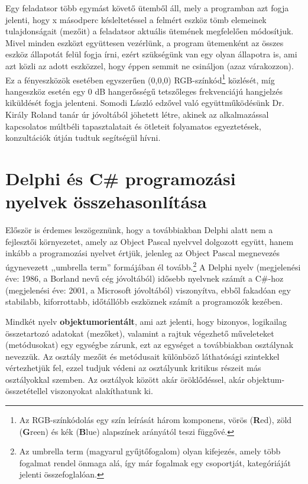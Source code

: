 \documentclass[tocnopagenum]{thesis-ekf}
\theoremstyle{definition}
\theoremstyle{remark}
\begin{document}
	Egy feladatsor több egymást követő ütemből áll, mely a programban azt fogja jelenti, hogy x másodperc késleltetéssel a felmért eszköz tömb elemeinek tulajdonságait (mezőit) a feladatsor aktuális ütemének megfelelően módosítjuk. Mivel minden eszközt együttesen vezérlünk, a program ütemenként az összes eszköz állapotát felül fogja írni, ezért szükségünk van egy olyan állapotra is, ami azt közli az adott eszközzel, hogy éppen semmit ne csináljon (azaz várakozzon). Ez a fényeszközök esetében egyszerűen (0,0,0) RGB-színkód\footnote{Az RGB-színkódolás egy szín leírását három komponens, vörös (\textbf{R}ed), zöld (\textbf{G}reen) és kék (\textbf{B}lue) alapszínek arányától teszi függővé.} közlését, míg hangeszköz esetén egy 0 dB hangerősségű tetszőleges frekvenciájú hangjelzés kiküldését fogja jelenteni.
	Somodi László edzővel való együttműködésünk Dr. Király Roland tanár úr jóvoltából jöhetett létre, akinek az alkalmazással kapcsolatos múltbéli tapasztalatait és  ötleteit folyamatos egyeztetések, konzultációk útján tudtuk segítségül hívni.
	\section{Delphi és C\# programozási nyelvek összehasonlítása}
	Először is érdemes leszögeznünk, hogy a továbbiakban Delphi alatt nem a fejlesztői környezetet, amely az Object Pascal nyelvvel dolgozott együtt, hanem inkább a programozási nyelvet értjük, jelenleg az Object Pascal megnevezés úgynevezett ,,umbrella term'' formájában él tovább.\footnote{Az umbrella term (magyarul gyűjtőfogalom) olyan kifejezés, amely több fogalmat rendel önmaga alá, így már fogalmak egy csoportját, kategóriáját jelenti összefoglalóan.} \cite{sof_delphi}
	A Delphi nyelv (megjelenési éve: 1986, a Borland nevű cég jóvoltából) idősebb nyelvnek számít a C\#-hoz (megjelenési éve: 2001, a Microsoft 
	jóvoltából) viszonyítva, ebből fakadóan egy stabilabb, kiforrottabb, időtállóbb eszköznek számít a programozók kezében. 
	
	Mindkét nyelv \textbf{objektumorientált}, ami azt jelenti, hogy bizonyos, logikailag összetartozó adatokat (mezőket), valamint a rajtuk végezhető műveleteket (metódusokat) egy egységbe zárunk, ezt az egységet a továbbiakban osztálynak nevezzük. Az osztály mezőit és metódusait különböző láthatósági szintekkel vértezhetjük fel, ezzel tudjuk védeni az osztályunk kritikus részeit más osztályokkal szemben. Az osztályok között akár öröklődéssel, akár objektum-összetétellel viszonyokat alakíthatunk ki.
	
\end{document}
